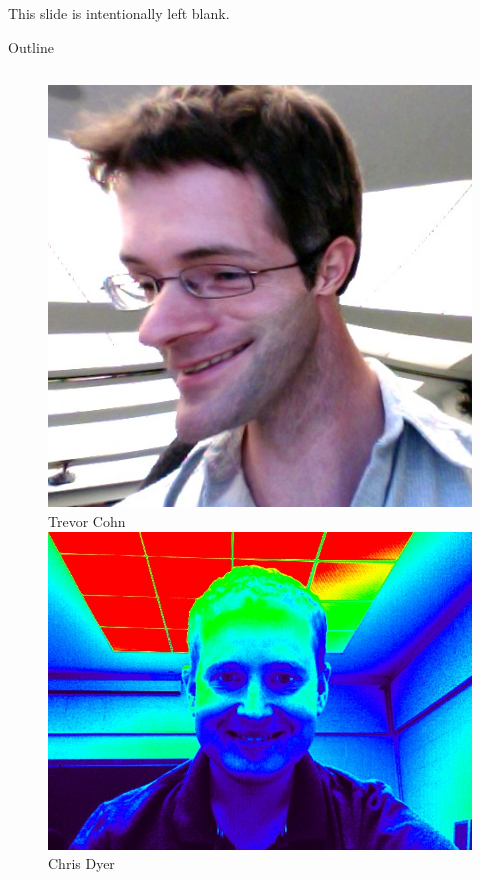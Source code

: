\documentclass{beamer}
\begin{document}
\begin{frame}[t]{This slide is intentionally left blank.}
\end{frame}

\begin{frame}[t]{Outline}
\begin{columns}
  \begin{column}{0.2\textwidth}
    \begin{exampleblock}{}
      \begin{figure}
        \tiny
        {\centering \includegraphics[scale=0.07]{trevor.jpg}} \\
        Trevor Cohn \\
        
        {\centering \includegraphics[scale=0.06]{dyer.jpg}} \\
        Chris Dyer\\
        

\end{figure}
\end{exampleblock}
\end{column}
\end{columns}
\end{frame}
\end{document}
